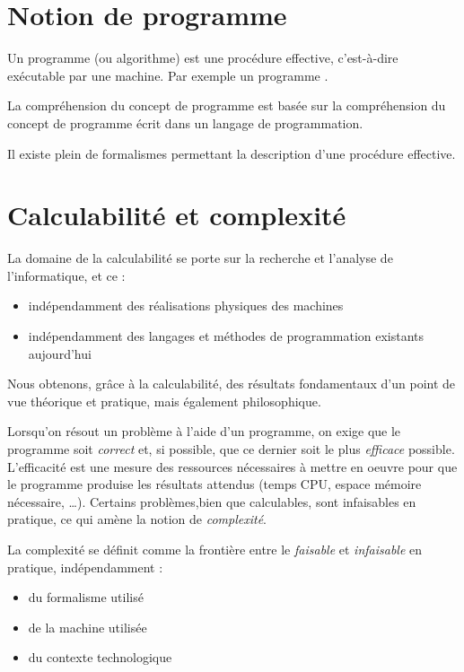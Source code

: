 \section{Notion de programme}
\label{sec:notion_de_programme}

Un programme (ou algorithme) est une \og procédure effective\fg, c'est-à-dire exécutable par une machine. Par exemple un programme \java.

La compréhension du concept de programme est basée sur la compréhension du concept de \og programme écrit dans un langage de programmation\fg.

Il existe plein de formalismes permettant la description d'une \og procédure effective\fg.

\section{Calculabilité et complexité}
\label{sec:calculabilite_et_complexite}

La domaine de la calculabilité se porte sur la recherche et l'analyse de l'informatique, et ce :

\begin{itemize}
	\item indépendamment des réalisations physiques des machines
	\item indépendamment des langages et méthodes de programmation existants aujourd'hui
\end{itemize}

Nous obtenons, grâce à la calculabilité, des résultats fondamentaux d'un point de vue théorique et pratique, mais également philosophique.

Lorsqu'on résout un problème à l'aide d'un programme, on exige que le programme soit \textit{correct} et, si possible, que ce dernier soit le plus \textit{efficace} possible. L'efficacité est une mesure des ressources nécessaires à mettre en oeuvre pour que le programme produise les résultats attendus (temps CPU, espace mémoire nécessaire, \ldots{}). Certains problèmes,bien que calculables, sont infaisables en pratique, ce qui amène la notion de \textit{complexité}.

La complexité se définit comme la frontière entre le \textit{faisable} et \textit{infaisable} en pratique, indépendamment :

\begin{itemize}
	\item du formalisme utilisé
	\item de la machine utilisée
	\item du contexte technologique
\end{itemize}

